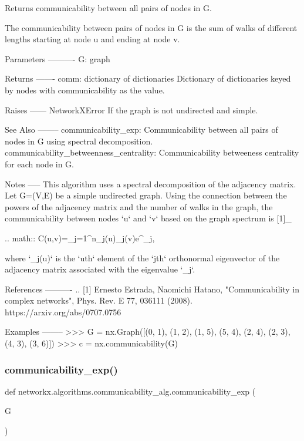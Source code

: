 \begin{DoxyVerb}Returns communicability between all pairs of nodes in G.

The communicability between pairs of nodes in G is the sum of
walks of different lengths starting at node u and ending at node v.

Parameters
----------
G: graph

Returns
-------
comm: dictionary of dictionaries
    Dictionary of dictionaries keyed by nodes with communicability
    as the value.

Raises
------
NetworkXError
   If the graph is not undirected and simple.

See Also
--------
communicability_exp:
   Communicability between all pairs of nodes in G  using spectral
   decomposition.
communicability_betweenness_centrality:
   Communicability betweeness centrality for each node in G.

Notes
-----
This algorithm uses a spectral decomposition of the adjacency matrix.
Let G=(V,E) be a simple undirected graph.  Using the connection between
the powers  of the adjacency matrix and the number of walks in the graph,
the communicability  between nodes `u` and `v` based on the graph spectrum
is [1]_

.. math::
    C(u,v)=\sum_{j=1}^{n}\phi_{j}(u)\phi_{j}(v)e^{\lambda_{j}},

where `\phi_{j}(u)` is the `u\rm{th}` element of the `j\rm{th}` orthonormal
eigenvector of the adjacency matrix associated with the eigenvalue
`\lambda_{j}`.

References
----------
.. [1] Ernesto Estrada, Naomichi Hatano,
   "Communicability in complex networks",
   Phys. Rev. E 77, 036111 (2008).
   https://arxiv.org/abs/0707.0756

Examples
--------
>>> G = nx.Graph([(0, 1), (1, 2), (1, 5), (5, 4), (2, 4), (2, 3), (4, 3), (3, 6)])
>>> c = nx.communicability(G)
\end{DoxyVerb}
 \mbox{\label{namespacenetworkx_1_1algorithms_1_1communicability__alg_ac724a15513044b68fc82f48808b07893}} 
\subsubsection{\texorpdfstring{communicability\+\_\+exp()}{communicability\_exp()}}
{\footnotesize\ttfamily def networkx.\+algorithms.\+communicability\+\_\+alg.\+communicability\+\_\+exp (\begin{DoxyParamCaption}\item[{}]{G }\end{DoxyParamCaption})}

